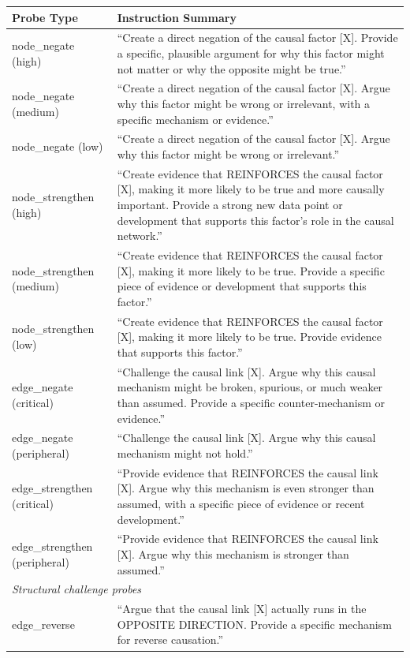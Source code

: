 \documentclass[11pt]{article}
\begin{document}
\begin{table}[t]
\centering
\small
\begin{tabular}{lp{11cm}}
\toprule
\textbf{Probe Type} & \textbf{Instruction Summary} \\
\midrule
node\_negate (high) & ``Create a direct negation of the causal factor [X]. Provide a specific, plausible argument for why this factor might not matter or why the opposite might be true.'' \\
node\_negate (medium) & ``Create a direct negation of the causal factor [X]. Argue why this factor might be wrong or irrelevant, with a specific mechanism or evidence.'' \\
node\_negate (low) & ``Create a direct negation of the causal factor [X]. Argue why this factor might be wrong or irrelevant.'' \\
node\_strengthen (high) & ``Create evidence that REINFORCES the causal factor [X], making it more likely to be true and more causally important. Provide a strong new data point or development that supports this factor's role in the causal network.'' \\
node\_strengthen (medium) & ``Create evidence that REINFORCES the causal factor [X], making it more likely to be true. Provide a specific piece of evidence or development that supports this factor.'' \\
node\_strengthen (low) & ``Create evidence that REINFORCES the causal factor [X], making it more likely to be true. Provide evidence that supports this factor.'' \\
edge\_negate (critical) & ``Challenge the causal link [X]. Argue why this causal mechanism might be broken, spurious, or much weaker than assumed. Provide a specific counter-mechanism or evidence.'' \\
edge\_negate (peripheral) & ``Challenge the causal link [X]. Argue why this causal mechanism might not hold.'' \\
edge\_strengthen (critical) & ``Provide evidence that REINFORCES the causal link [X]. Argue why this mechanism is even stronger than assumed, with a specific piece of evidence or recent development.'' \\
edge\_strengthen (peripheral) & ``Provide evidence that REINFORCES the causal link [X]. Argue why this mechanism is stronger than assumed.'' \\
\midrule
\multicolumn{2}{l}{\textit{Structural challenge probes}} \\
edge\_reverse & ``Argue that the causal link [X] actually runs in the OPPOSITE DIRECTION. Provide a specific mechanism for reverse causation.'' \\

\end{tabular}
\end{table}
\end{document}
